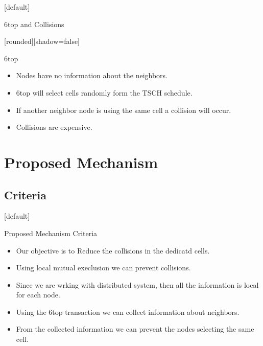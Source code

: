 \documentclass{beamer}
\makeatletter
\newenvironment{withoutheadline}{
        \setbeamertemplate{headline}[default]
        \def\beamer@entrycode{\vspace*{-\headheight}}
    }{}
\makeatother
\begin{document}
  \begin{withoutheadline}
\begin{frame}{6top and Collisions}

[rounded][shadow=false]


\begin{block}{6top}

    \begin{itemize}
    \item Nodes have no information about the neighbors.
    \item 6top will select cells randomly form the TSCH schedule. 
    \item If another neighbor node is using the same cell a collision will occur. 
    \item Collisions are expensive.
    \end{itemize}
    \end{block}




\end{frame}
\end{withoutheadline}

\section{Proposed Mechanism}

\subsection{Criteria}
\begin{withoutheadline}
\begin{frame}{Proposed Mechanism Criteria}
\begin{itemize}
    \item Our objective is to Reduce the collisions in the dedicatd cells.\pause
    \item Using local mutual execlusion we can prevent collisions.\pause  
    \item Since we are wrking with distributed system, then all the information is local for each node. \pause
    \item Using the 6top transaction we can collect information about neighbors. \pause
    \item From the collected information we can prevent the nodes selecting the same cell. \pause
    \end{itemize}

\end{frame}
\end{withoutheadline}
\end{document}
